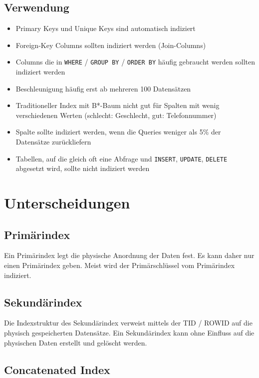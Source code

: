 \subsection{Verwendung}

\begin{itemize}
    \item Primary Keys und Unique Keys sind automatisch indiziert
    \item Foreign-Key Columns sollten indiziert werden (Join-Columns)
    \item Columns die in \lstinline{WHERE} / \lstinline{GROUP BY} / \lstinline{ORDER BY} häufig gebraucht werden sollten indiziert werden
    \item Beschleunigung häufig erst ab mehreren 100 Datensätzen
    \item Traditioneller Index mit B*-Baum nicht gut für Spalten mit wenig verschiedenen Werten (schlecht: Geschlecht, gut: Telefonnummer)
    \item Spalte sollte indiziert werden, wenn die Queries weniger als 5\% der Datensätze zurückliefern
    \item Tabellen, auf die gleich oft eine Abfrage und \lstinline{INSERT}, \lstinline{UPDATE}, \lstinline{DELETE} abgesetzt wird, sollte nicht indiziert werden
\end{itemize}

\section{Unterscheidungen}

\subsection{Primärindex}

Ein Primärindex legt die physische Anordnung der Daten fest. Es kann daher nur einen Primärindex geben. Meist wird der Primärschlüssel vom Primärindex indiziert.

\subsection{Sekundärindex}

Die Indexstruktur des Sekundärindex verweist mittels der TID / ROWID auf die physisch gespeicherten Datensätze. Ein Sekundärindex kann ohne Einfluss auf die physischen Daten erstellt und gelöscht werden.

\subsection{Concatenated Index}

